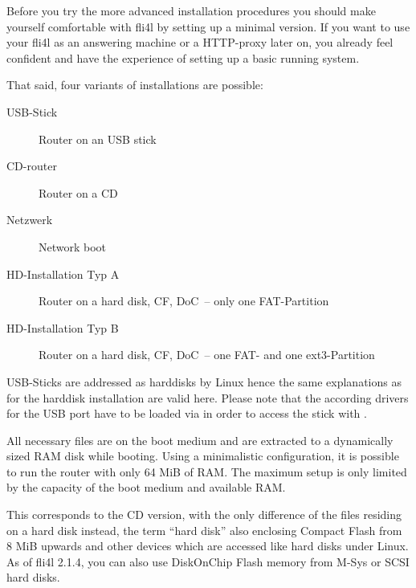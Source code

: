 Before you try the more advanced installation procedures you should make yourself
comfortable with fli4l by setting up a minimal version. If you want to use your fli4l
as an answering machine or a HTTP-proxy later on, you already feel confident and have
the experience of setting up a basic running system.

That said, four variants of installations are possible:

\begin{description}
\item[USB-Stick] Router on an USB stick
\item[CD-router] Router on a CD
\item[Netzwerk] Network boot
\item[HD-Installation Typ A] Router on a hard disk, CF, DoC~-- only one FAT-Partition
\item[HD-Installation Typ B] Router on a hard disk, CF, DoC~-- one FAT- and one ext3-Partition
\end{description}


USB-Sticks are addressed as harddisks by Linux hence the same explanations
as for the harddisk installation are valid here. Please note that the
according drivers for the USB port have to be loaded via 
in order to access the stick with .


All necessary files are on the boot medium and are extracted to a dynamically
sized RAM disk while booting. Using a minimalistic configuration, it is
possible to run the router with only 64 MiB of RAM. The maximum setup
is only limited by the capacity of the boot medium and available RAM.


This corresponds to the CD version, with the only difference of the
files residing on a hard disk instead, the term ``hard disk''
also enclosing Compact Flash from 8 MiB upwards and other devices which are
accessed like hard disks under Linux. As of fli4l 2.1.4, you can also use
DiskOnChip Flash memory from M-Sys or SCSI hard disks.

